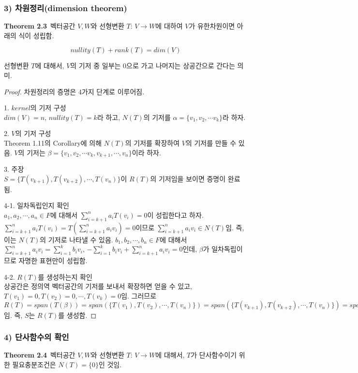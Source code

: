 \documentclass[10pt, a4paper]{article}
\begin{document}
\subsubsection*{3) 차원정리(dimension theorem)}
\textbf{Theorem 2.3}\, 벡터공간 $V,W$와 선형변환 $T:\,V \rightarrow W$에 대하여 $V$가 유한차원이면 아래의 식이 성립함.

\[
nullity(T)+rank(T)=dim(V)
\]

선형변환 $T$에 대해서, $V$의 기저 중 일부는 0으로 가고 나머지는 상공간으로 간다는 의미.

\begin{proof}
차원정리의 증명은 4가지 단계로 이루어짐.

1. $kernel$의 기저 구성\\
$dim(V)=n$, $nullity(T)=k$라 하고, $N(T)$의 기저를 $\alpha = \{ v_1,v_2, \cdots v_k \}$라 하자.

2. $V$의 기저 구성\\
Theorem 1.11의 Corollary에 의해 $N(T)$의 기저를 확장하여 $V$의 기저를 만들 수 있음. $V$의 기저는 $\beta = \{ v_1,v_2, \cdots v_k,v_{k+1}, \cdots ,v_n \}$이라 하자.

3. 주장\\
$S=\{ T(v_{k+1}),T(v_{k+2}), \cdots ,T(v_n) \}$이 $R(T)$의 기저임을 보이면 증명이 완료됨.

4-1. 일차독립인지 확인\\
$a_1,a_2, \cdots ,a_n \in F$에 대해서 $\sum_{i=k+1}^{n}{a_{i}T(v_{i})}=0$이 성립한다고 하자. $\sum_{i=k+1}^{n}{a_{i}T(v_{i})}=T(\sum_{i=k+1}^{n}{a_{i}v_{i}})=0$이므로 $\sum_{i=k+1}^{n}{a_{i}v_{i}} \in N(T)$임. 즉, 이는 $N(T)$의 기저로 나타낼 수 있음. $b_1,b_2, \cdots ,b_n \in F$에 대해서 $\sum_{i=k+1}^{n}{a_{i}v_{i}}=\sum_{i=1}^{k}{b_{i}v_{i}}$, $-\sum_{i=1}^{k}{b_{i}v_{i}} + \sum_{i=k+1}^{n}{a_{i}v_{i}}=0$인데, $\beta$가 일차독립이므로 자명한 표현만이 성립함.

4-2. $R(T)$를 생성하는지 확인\\
상공간은 정의역 벡터공간의 기저를 보내서 확장하면 얻을 수 있고, $T(v_{1})=0,T(v_{2})=0, \cdots ,T(v_k)=0$임. 그러므로 $R(T)=span(T(\beta))=span(\{ T(v_{1}),T(v_{2}), \cdots ,T(v_n) \})=span(\{ T(v_{k+1}),T(v_{k+2}), \cdots ,T(v_n) \})=span(S)$임. 즉, $S$는 $R(T)$를 생성함.
\end{proof}

\subsubsection*{4) 단사함수의 확인}
\textbf{Theorem 2.4}\, 벡터공간 $V,W$와 선형변환 $T:\,V \rightarrow W$에 대해서, $T$가 단사함수이기 위한 필요충분조건은 $N(T)=\{0\}$인 것임.
\end{document}
